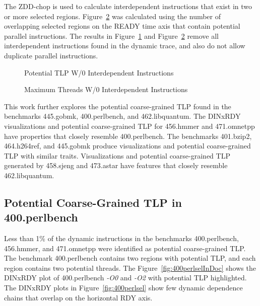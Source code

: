 \documentclass[defaultstyle,11pt]{thesis}
\begin{document}
The ZDD-chop is used to calculate interdependent instructions that
exist in two or more selected
regions. Figure~\ref{fig:tlpInterferParallel} was calculated using
the number of overlapping selected regions on the READY time axis that
contain potential parallel instructions. The results in
Figure~\ref{fig:tlpInterferPerf} and
Figure~\ref{fig:tlpInterferParallel} remove all interdependent
instructions found in the dynamic trace, and also do not allow
duplicate parallel instructions.

\begin{figure}
  \centering
  \caption{Potential TLP W/0 Interdependent Instructions}
  \label{fig:tlpInterferPerf}
\end{figure}


\begin{figure}
  \centering
  \caption{Maximum Threads W/0 Interdependent Instructions}
  \label{fig:tlpInterferParallel}
\end{figure}

This work further explores the potential coarse-grained TLP found in
the benchmarks 445.gobmk, 400.perlbench, and 462.libquantum.  The
DINxRDY visualizations and potential coarse-grained TLP for 456.hmmer
and 471.omnetpp have properties that closely resemble 400.perlbench.
The benchmarks 401.bzip2, 464.h264ref, and 445.gobmk produce
visualizations and potential coarse-grained TLP with similar
traits. Visualizations and potential coarse-grained TLP generated by
458.sjeng and 473.astar have features that closely resemble
462.libquantum.

\subsection{Potential Coarse-Grained TLP in 400.perlbench}

Less than 1\% of the dynamic instructions in the benchmarks
400.perlbench, 456.hmmer, and 471.omnetpp were identified as potential
coarse-grained TLP.  The benchmark 400.perlbench contains two regions
with potential TLP, and each region contains two potential threads.
The Figure~\ref{fig:400perlselInDoc} shows the DINxRDY plot of
400.perlbench \textit{-O0} and \textit{-O2} with potential TLP
highlighted.  The DINxRDY plots in Figure~\ref{fig:400perlsel} show
few dynamic dependence chains that overlap on the horizontal RDY axis.
\end{document}

